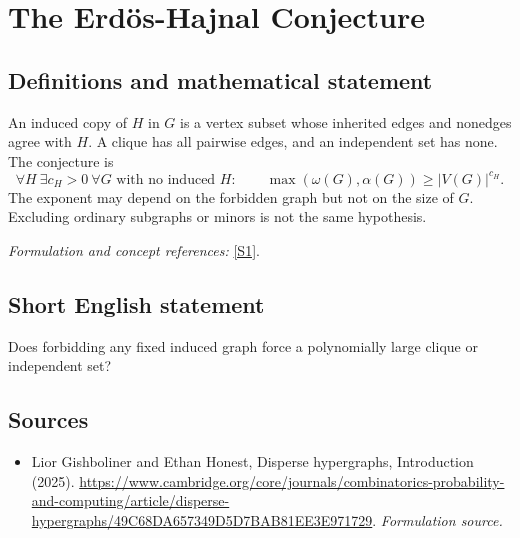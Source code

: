 \documentclass[11pt]{article}
\begin{document}
\section*{\texorpdfstring{The Erdös-Hajnal Conjecture}{The Erdös-Hajnal Conjecture}}\label{3281}
\subsection{Definitions and mathematical statement}
An induced copy of $H$ in $G$ is a vertex subset whose inherited edges and nonedges agree with $H$. A clique has all pairwise edges, and an independent set has none. The conjecture is
\[
 \forall H\ \exists c_H>0\ \forall G\text{ with no induced }H:\qquad
 \max(\omega(G),\alpha(G))\ge |V(G)|^{c_H}.
\]
The exponent may depend on the forbidden graph but not on the size of $G$. Excluding ordinary subgraphs or minors is not the same hypothesis.
\par\smallskip\textit{Formulation and concept references:} \href{https://www.cambridge.org/core/journals/combinatorics-probability-and-computing/article/disperse-hypergraphs/49C68DA657349D5D7BAB81EE3E971729}{[S1]}.

\subsection{Short English statement}
Does forbidding any fixed induced graph force a polynomially large clique or independent set?
\subsection{Sources}
\begin{itemize}
\item[S1]Lior Gishboliner and Ethan Honest, Disperse hypergraphs, Introduction (2025).
\url{https://www.cambridge.org/core/journals/combinatorics-probability-and-computing/article/disperse-hypergraphs/49C68DA657349D5D7BAB81EE3E971729}.
\textit{Formulation source.}
\end{itemize}
\end{document}
